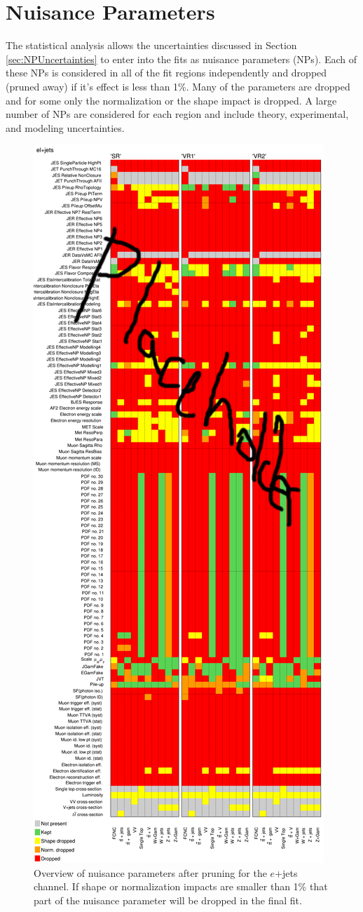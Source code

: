 \section{Nuisance Parameters}
The statistical analysis allows the uncertainties discussed in Section \ref{sec:NPUncertainties} to enter into the fits as nuisance parameters (NPs).  Each of these NPs is considered in all of the fit regions independently and dropped (pruned away) if it's effect is less than 1\%.  Many of the parameters are dropped and for some only the normalization or the shape impact is dropped.  A large number of NPs are considered for each region and include theory, experimental, and modeling uncertainties.

\begin{figure}[h!]
	\centering
	\includegraphics[width=.5\columnwidth]{../ThesisImages/RegionPlots/FinalRegions/FCNC_All_ejets/Pruning.png}
	\caption[Nuisance parameters after pruning for $e$+jets channel]{Overview of nuisance parameters after pruning for the $e$+jets channel.  If shape or normalization impacts are smaller than 1\% that part of the nuisance parameter will be dropped in the final fit. }
	\label{fig:Pruningejets}
\end{figure}

